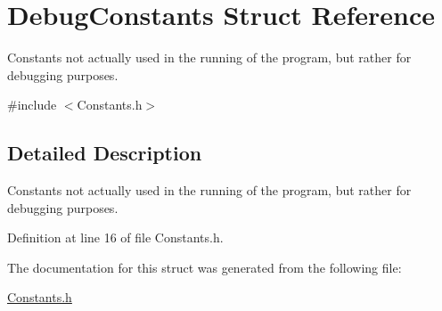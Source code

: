 \hypertarget{structDebugConstants}{
\section{DebugConstants Struct Reference}
\label{structDebugConstants}
}


Constants not actually used in the running of the program, but rather for debugging purposes.  




{\ttfamily \#include $<$Constants.h$>$}



\subsection{Detailed Description}
Constants not actually used in the running of the program, but rather for debugging purposes. 

Definition at line 16 of file Constants.h.



The documentation for this struct was generated from the following file:\begin{DoxyCompactItemize}
\item 
\hyperlink{Constants_8h}{Constants.h}\end{DoxyCompactItemize}
